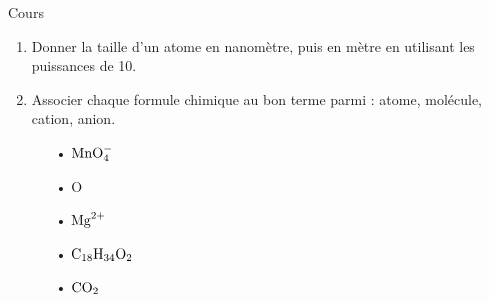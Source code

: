 \documentclass[12pt,a4paper]{article}
\begin{document}
\begin{exo}{Cours}
\begin{enumerate}
\item \rco{}  \rea{} 

Donner la taille d'un atome en nanomètre, puis en mètre en utilisant les puissances de 10.

\item \rco{} 

Associer chaque formule chimique au bon terme parmi : atome, molécule, cation, anion.
\begin{multicols}{5}
\begin{itemize}
\item[•] $\mathrm{MnO}_\mathrm{4}^\mathrm{-}$
\item[•] $\text{O}$
\item[•] $\mathrm{Mg}^\mathrm{2+}$
\item[•] $\mathrm{C}_\mathrm{18}\mathrm{H}_\mathrm{34}\mathrm{O}_\mathrm{2}$
\item[•] $\mathrm{CO}_\mathrm{2}$
\end{itemize}
\end{multicols}


\end{enumerate}

\end{exo}

\newpage
\end{document}
